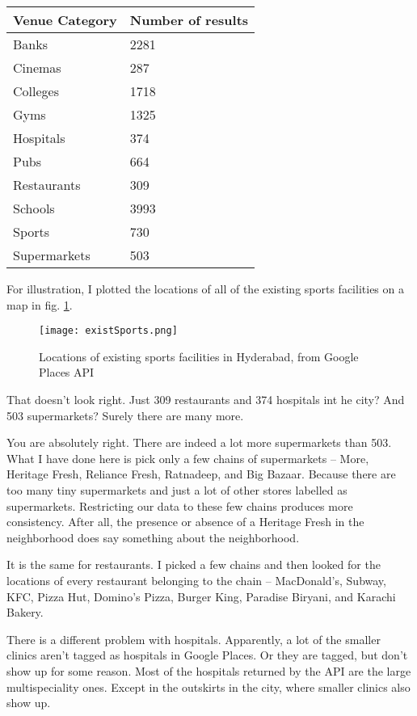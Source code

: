 \begin{tabular}{ll}
\toprule
Venue Category & Number of results \\
\midrule
Banks 		& 2281 \\
Cinemas		& 287 \\
Colleges 	& 1718 \\
Gyms 		& 1325 \\
Hospitals 	& 374 \\
Pubs		& 664 \\
Restaurants	& 309 \\
Schools 	& 3993 \\
Sports 		& 730  \\
Supermarkets 	& 503 \\
\bottomrule
\end{tabular}

For illustration, I plotted the locations of all of the existing sports facilities on a map in fig. \ref{fig:existing-sports}. 

\begin{figure}
	\centering
	\texttt{[image: existSports.png]}
	\caption{Locations of existing sports facilities in Hyderabad, from Google Places API\label{fig:existing-sports}}
\end{figure}

{\color{blue} That doesn't look right. Just 309 restaurants and 374 hospitals int he city? And 503 supermarkets? Surely there are many more.}

You are absolutely right. There are indeed a lot more supermarkets than 503. What I have done here is pick only a few chains of supermarkets -- More, Heritage Fresh, Reliance Fresh, Ratnadeep, and Big Bazaar. Because there are too many tiny supermarkets and just a lot of other stores labelled as supermarkets. Restricting our data to these few chains produces more consistency. After all, the presence or absence of a Heritage Fresh in the neighborhood does say something about the neighborhood. 

It is the same for restaurants. I picked a few chains and then looked for the locations of every restaurant belonging to the chain -- MacDonald's, Subway, KFC, Pizza Hut, Domino's Pizza, Burger King, Paradise Biryani, and Karachi Bakery. 

There is a different problem with hospitals. Apparently, a lot of the smaller clinics aren't tagged as hospitals in Google Places. Or they are tagged, but don't show up for some reason. Most of the hospitals returned by the API are the large multispeciality ones. Except in the outskirts in the city, where smaller clinics also show up.

